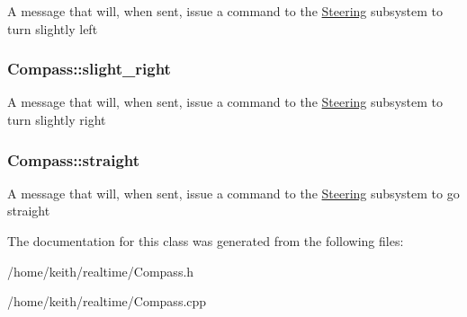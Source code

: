 A message that will, when sent, issue a command to the \hyperlink{classSteering}{Steering} subsystem to turn slightly left \hypertarget{classCompass_a9e9ff6610d60e6fd915984a3f3e40e13}{
\subsubsection[{slight\-\_\-right}]{ Compass\-::slight\-\_\-right}}\label{classCompass_a9e9ff6610d60e6fd915984a3f3e40e13}
A message that will, when sent, issue a command to the \hyperlink{classSteering}{Steering} subsystem to turn slightly right \hypertarget{classCompass_aa11186aa6caf9dced42940552bf24da2}{
\subsubsection[{straight}]{ Compass\-::straight}}\label{classCompass_aa11186aa6caf9dced42940552bf24da2}
A message that will, when sent, issue a command to the \hyperlink{classSteering}{Steering} subsystem to go straight 

The documentation for this class was generated from the following files\-:\begin{DoxyCompactItemize}
\item 
/home/keith/realtime/Compass.\-h\item 
/home/keith/realtime/Compass.\-cpp\end{DoxyCompactItemize}
